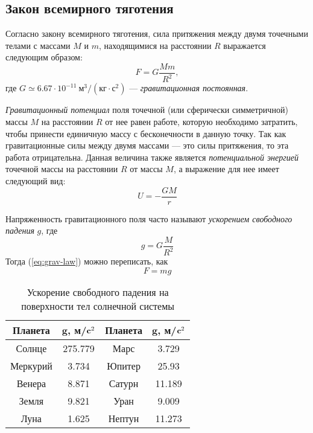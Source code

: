 \subsection{Закон всемирного тяготения}
Согласно закону всемирного тяготения, сила притяжения 
между двумя точечными телами с массами $M$ и $m$,
находящимися на расстоянии $R$ выражается следующим
образом:\begin{equation}
	F=G\frac{Mm}{R^2}, \label{eq:grav-law}
\end{equation}
где $G\simeq 6.67\cdot 10^{-11}~\text{м}^3 / 
\left( \text{кг} \cdot \text{с}^2 \right)$ --- 
{\itshape гравитационная постоянная}.

{\itshape Гравитационный потенциал} поля точечной (или сферически 
симметричной) массы $M$ на расстоянии $R$ от нее равен
работе, которую необходимо затратить, чтобы принести
единичную массу с бесконечности в данную точку. Так как
гравитационные силы между двумя массами --- это силы 
притяжения, то эта работа отрицательна. Данная
величина также является {\itshape потенциальной энергией} точечной
массы на расстоянии $R$ от массы $M$, а выражение для нее имеет 
следующий вид:\begin{equation}
U=-\frac{GM}{r}
\end{equation}

Напряженность гравитационного поля часто называют 
{\itshape ускорением свободного падения} $g$, где\begin{equation}
	g = G \frac{M}{R^2}
\end{equation}
Тогда (\ref{eq:grav-law}) можно переписать, как \begin{equation}
	F = mg
\end{equation}
\begin{table}[h!]
\centering
\begin{tabular}{|c|c|c|c|}
\hline 
{\bfseries Планета} & $\mathbf{g}$, 
{\bfseries м/$\text{\bfseries c}^2$} 
& {\bfseries Планета} & $\mathbf{g}$, 
{\bfseries м/$\text{\bfseries c}^2$}\\
\hline
Солнце & 275.779 & Марс & 3.729\\
\hline
Меркурий & 3.734 & Юпитер & 25.93\\
\hline
Венера & 8.871 & Сатурн & 11.189\\
\hline
Земля & 9.821 & Уран & 9.009\\
\hline
Луна & 1.625 & Нептун & 11.273\\
\hline
\end{tabular}
\caption{Ускорение свободного падения на поверхности тел 
солнечной системы}
\end{table}